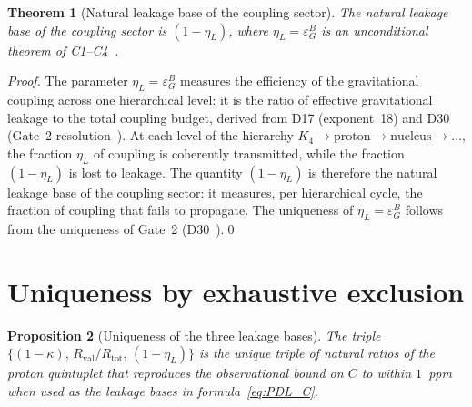 \documentclass[12pt,a4paper]{article}
\newtheorem{theorem}{Theorem}[section]
\newtheorem{proposition}[theorem]{Proposition}
\newcommand{\Kfour}{K_4}
\newcommand{\Rtot}{R_{\mathrm{tot}}}
\newcommand{\Rval}{R_{\mathrm{val}}}
\newcommand{\kap}{\kappa}
\newcommand{\etaL}{\eta_L}
\begin{document}
\begin{theorem}[Natural leakage base of the coupling sector]
\label{thm:base_coup}
The natural leakage base of the coupling sector is $(1-\etaL)$, where $\etaL = \varepsilon_G^B$ is an unconditional theorem of C1--C4~\cite{PDL_D17_2026,PDL_D30_2026}.
\end{theorem}

\begin{proof}
The parameter $\etaL = \varepsilon_G^B$ measures the efficiency of the gravitational coupling across one hierarchical level: it is the ratio of effective gravitational leakage to the total coupling budget, derived from D17 (exponent~18) and D30 (Gate~2 resolution~\cite{PDL_D17_2026,PDL_D30_2026}). At each level of the hierarchy $\Kfour \to \mathrm{proton} \to \mathrm{nucleus} \to \ldots$, the fraction $\etaL$ of coupling is coherently transmitted, while the fraction $(1-\etaL)$ is lost to leakage. The quantity $(1-\etaL)$ is therefore the natural leakage base of the coupling sector: it measures, per hierarchical cycle, the fraction of coupling that fails to propagate. The uniqueness of $\etaL = \varepsilon_G^B$ follows from the uniqueness of Gate~2 (D30~\cite{PDL_D30_2026}).\qed
\end{proof}

\section{Uniqueness by exhaustive exclusion}
\label{sec:uniqueness}

\begin{proposition}[Uniqueness of the three leakage bases]
\label{prop:uniqueness}
The triple $\{(1-\kap),\, \Rval/\Rtot,\, (1-\etaL)\}$ is the unique triple of natural ratios of the proton quintuplet that reproduces the observational bound on $C$ to within $1$~ppm when used as the leakage bases in formula~\eqref{eq:PDL_C}.
\end{proposition}
\end{document}
